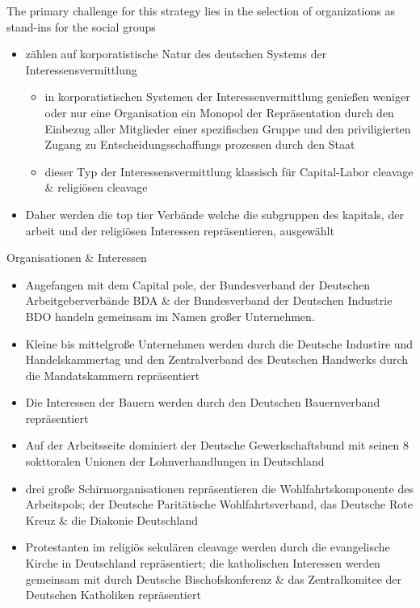 \documentclass[11pt]{article}
\begin{document}
\begin{enumerate}
The primary challenge for this strategy lies in the selection of organizations as stand-ins for the social groups

\begin{itemize}
\item zählen auf korporatistische Natur des deutschen Systems der Interessensvermittlung 
\begin{itemize}
\item in korporatistischen Systemen der Interessenvermittlung  genießen weniger oder nur eine Organisation ein Monopol der Repräsentation durch den Einbezug aller Mitglieder einer spezifischen Gruppe und den priviligierten Zugang zu Entscheidungsschaffungs prozessen durch den Staat
\item dieser Typ der Interessensvermittlung klassisch für Capital-Labor cleavage \& religiösen cleavage
\end{itemize}
\item Daher werden die top tier Verbände welche die subgruppen des kapitals, der arbeit und der religiösen Interessen repräsentieren, ausgewählt
\end{itemize}

Organisationen \& Interessen 

\begin{itemize}
\item Angefangen mit dem Capital pole, der Bundesverband der Deutschen Arbeitgeberverbände BDA \& der Bundesverband der Deutschen Industrie BDO handeln gemeinsam im Namen großer Unternehmen.
\item Kleine bis mittelgroße Unternehmen werden durch die Deutsche Industire und Handelskammertag und den Zentralverband des Deutschen Handwerks durch die Mandatskammern repräsentiert
\item Die Interessen der Bauern werden durch den Deutschen Bauernverband repräsentiert
\item Auf der Arbeitsseite dominiert der Deutsche Gewerkschaftsbund mit seinen 8 sokttoralen Unionen der Lohnverhandlungen in Deutschland
\item drei große Schirmorganisationen repräsentieren die Wohlfahrtskomponente des Arbeitspols; der Deutsche Paritätische Wohlfahrtsverband, das Deutsche Rote Kreuz \& die Diakonie Deutschland
\item Protestanten im religiös sekulären cleavage werden durch die evangelische Kirche in Deutschland repräsentiert; die katholischen Interessen werden gemeinsam mit durch Deutsche Bischofskonferenz \& das Zentralkomitee der Deutschen Katholiken repräsentiert
\end{itemize}


\end{enumerate}
\end{document}
